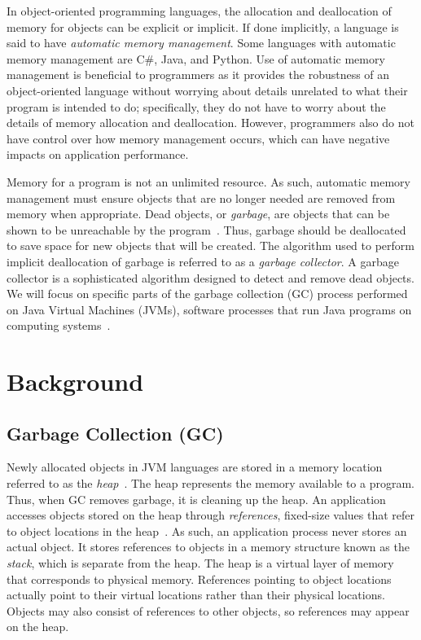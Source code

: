 \documentclass{sig-alternate}
\begin{document}
In object-oriented programming languages, the allocation and deallocation
of memory for objects can be explicit or implicit. If done implicitly,
a language is said to have \emph{automatic memory management}. Some languages 
with automatic memory management are C\#, Java, and Python.
Use of automatic memory management is beneficial to programmers as it provides
the robustness of an object-oriented language without worrying about
details unrelated to what their program is intended to do; specifically, they do
not have to worry about the details of memory allocation and deallocation. 
However, programmers also do not have control over how memory management occurs,
which can have negative impacts on application performance.

Memory for a program is not an unlimited resource. As such, automatic memory management
must ensure objects that are no longer needed are removed from memory
when appropriate. Dead objects, or \emph{garbage}, are objects that can be shown
to be unreachable by the program~\cite{glossary:g}. Thus, garbage should be deallocated to 
save space for new objects that will be created. The algorithm used to perform implicit
deallocation of garbage is referred to as a \emph{garbage collector}.
A garbage collector is a sophisticated algorithm designed to detect
and remove dead objects. We will focus on specific parts of the 
garbage collection (GC) process performed on Java Virtual Machines 
(JVMs), software processes that run Java programs on computing systems~\cite{Lindblom:2011}.



\section{Background}
\label{sec:background}


\subsection{Garbage Collection (GC)}
\label{sec:garbageCollection}

Newly allocated objects in JVM languages are stored in a memory location referred
to as the \emph{heap}~\cite{oracle:heap}. The heap represents the memory available to a program.
Thus, when GC removes garbage, it is cleaning up the heap.
An application accesses objects stored on the heap through \emph{references},
fixed-size values that refer to object locations in the heap~\cite{reilly:reference}. 
As such, an application process never stores
an actual object. It stores references to objects in a memory structure known
as the \emph{stack}, which is separate from the heap.
The heap is a virtual layer of memory that corresponds to physical memory.
References pointing to object locations actually point to their
virtual locations rather than their physical locations. Objects may also 
consist of references to other objects, so references may appear on the heap.
\end{document}
